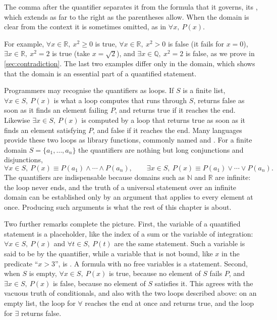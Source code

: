 The comma after the quantifier separates it from the formula that it governs, its , which extends as far to the right as the parentheses allow. When the domain is clear from the context it is sometimes omitted, as in $\forall x,\ P(x)$.

For example, $\forall x\in\mathbb R,\ x^2\ge 0$ is true, $\forall x\in\mathbb R,\ x^2>0$ is false (it fails for $x=0$), $\exists x\in\mathbb R,\ x^2=2$ is true (take $x=\sqrt2$), and $\exists x\in\mathbb Q,\ x^2=2$ is false, as we prove in \cref{sec:contradiction}. The last two examples differ only in the domain, which shows that the domain is an essential part of a quantified statement.

Programmers may recognise the quantifiers as loops. If $S$ is a finite list, $\forall x\in S,\ P(x)$ is what a loop computes that runs through $S$, returns false as soon as it finds an element failing $P$, and returns true if it reaches the end. Likewise $\exists x\in S,\ P(x)$ is computed by a loop that returns true as soon as it finds an element satisfying $P$, and false if it reaches the end. Many languages provide these two loops as library functions, commonly named  and . For a finite domain $S=\{a_1,\ldots,a_n\}$ the quantifiers are nothing but long conjunctions and disjunctions,
\[
\forall x\in S,\ P(x)\equiv P(a_1)\wedge\cdots\wedge P(a_n),
\qquad
\exists x\in S,\ P(x)\equiv P(a_1)\vee\cdots\vee P(a_n).
\]
The quantifiers are indispensable because domains such as $\mathbb N$ and $\mathbb R$ are infinite: the loop never ends, and the truth of a universal statement over an infinite domain can be established only by an argument that applies to every element at once. Producing such arguments is what the rest of this chapter is about.

Two further remarks complete the picture. First, the variable of a quantified statement is a placeholder, like the index of a sum or the variable of integration: $\forall x\in S,\ P(x)$ and $\forall t\in S,\ P(t)$ are the same statement. Such a variable is said to be  by the quantifier, while a variable that is not bound, like $x$ in the predicate ``$x>3$'', is . A formula with no free variables is a statement. Second, when $S$ is empty, $\forall x\in S,\ P(x)$ is true, because no element of $S$ fails $P$, and $\exists x\in S,\ P(x)$ is false, because no element of $S$ satisfies it. This agrees with the vacuous truth of conditionals, and also with the two loops described above: on an empty list, the loop for $\forall$ reaches the end at once and returns true, and the loop for $\exists$ returns false.

